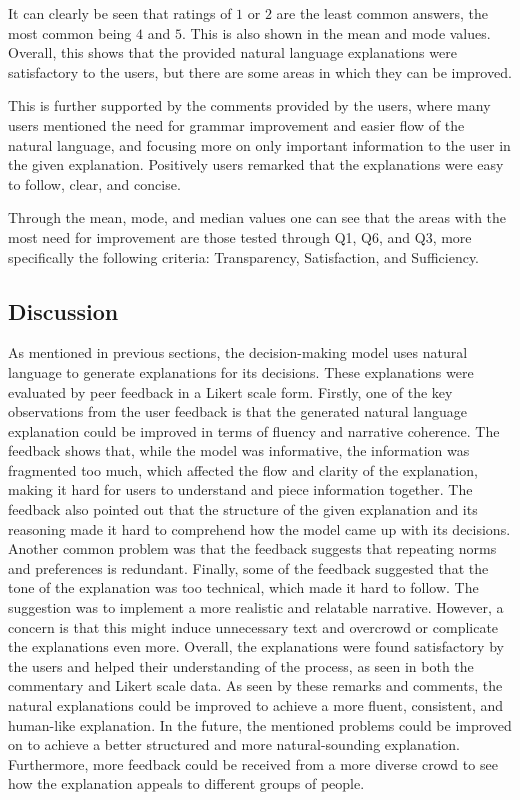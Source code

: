 \documentclass[sigconf,nonacm]{acmart}
\begin{document}
It can clearly be seen that ratings of $1$ or $2$ are the least common answers, the most common being $4$ and $5$. This is also shown in the mean and mode values. Overall, this shows that the provided natural language explanations were satisfactory to the users, but there are some areas in which they can be improved.

This is further supported by the comments provided by the users, where many users mentioned the need for grammar improvement and easier flow of the natural language, and focusing more on only important information to the user in the given explanation. Positively users remarked that the explanations were easy to follow, clear, and concise.

Through the mean, mode, and median values one can see that the areas with the most need for improvement are those tested through Q1, Q6, and Q3, more specifically the following criteria: Transparency, Satisfaction, and Sufficiency.


\subsection{Discussion} \label{subsec:discussion}
As mentioned in previous sections, the decision-making model uses natural language to generate explanations for its decisions. These explanations were evaluated by peer feedback in a Likert scale form. Firstly, one of the key observations from the user feedback is that the generated natural language explanation could be improved in terms of fluency and narrative coherence. The feedback shows that, while the model was informative, the information was fragmented too much, which affected the flow and clarity of the explanation, making it hard for users to understand and piece information together. The feedback also pointed out that the structure of the given explanation and its reasoning made it hard to comprehend how the model came up with its decisions. Another common problem was that the feedback suggests that repeating norms and preferences is redundant. Finally, some of the feedback suggested that the tone of the explanation was too technical, which made it hard to follow. The suggestion was to implement a more realistic and relatable narrative. However, a concern is that this might induce unnecessary text and overcrowd or complicate the explanations even more. Overall, the explanations were found satisfactory by the users and helped their understanding of the process, as seen in both the commentary and Likert scale data. As seen by these remarks and comments, the natural explanations could be improved to achieve a more fluent, consistent, and human-like explanation. In the future, the mentioned problems could be improved on to achieve a better structured and more natural-sounding explanation. Furthermore, more feedback could be received from a more diverse crowd to see how the explanation appeals to different groups of people.
\end{document}
